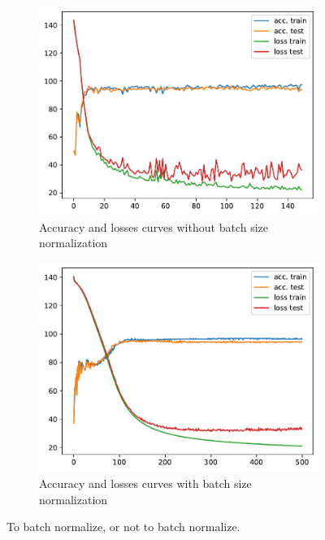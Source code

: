 \begin{figure}[H]
    \centering
    \begin{subfigure}{0.45\textwidth}
        \centering
        \includegraphics[width=\textwidth]{figs/NN/manual_acc_loss.pdf}
        \caption{Accuracy and losses curves without batch size normalization}
        \label{subfig:manual_acc_loss}
    \end{subfigure}
    \begin{subfigure}{0.45\textwidth}
        \centering
        \includegraphics[width=\textwidth]{figs/NN/manual_acc_loss_bis.pdf}
        \caption{Accuracy and losses curves with batch size normalization}
        \label{subfig:manual_acc_loss_bis}
    \end{subfigure}
    \caption{To batch normalize, or not to batch normalize.}
    \label{fig:manual_nn}
\end{figure}

